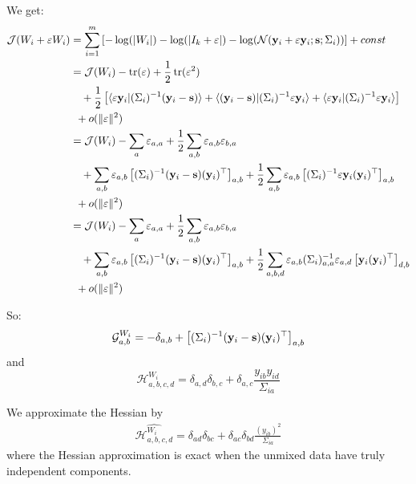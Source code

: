 \documentclass{report}
\begin{document}
 We get:
 \begin{align}
   \mathcal{J}(W_i + \varepsilon W_i) &= \sum_{i=1}^m \left[ -\log(|W_i|) -\log(|I_k + \varepsilon|) - \log(\mathcal{N}(\mathbf{y}_i + \varepsilon \mathbf{y}_i; \mathbf{s}; \Sigma_i)) \right] + const \\
                                      &= \mathcal{J}(W_i) - \mathop{\mathrm{tr}}(\varepsilon) + \frac12 \mathop{\mathrm{tr}}(\varepsilon^2) \\& \enspace \enspace + \frac12 \left[\langle \varepsilon \mathbf{y}_i| (\Sigma_i)^{-1} (\mathbf{y}_i - \mathbf{s}) \rangle + \langle (\mathbf{y}_i - \mathbf{s})| (\Sigma_i)^{-1} \varepsilon \mathbf{y}_i \rangle + \langle \varepsilon \mathbf{y}_i| (\Sigma_i)^{-1} \varepsilon \mathbf{y}_i \rangle \right] \\ & \enspace + o(\|\varepsilon\|^2) \\
   &= \mathcal{J}(W_i) - \sum_a \varepsilon_{a, a} + \frac12 \sum_{a, b} \varepsilon_{a,b} \varepsilon_{b, a} \\& \enspace \enspace + \sum_{a, b} \varepsilon_{a, b} \left[(\Sigma_i)^{-1}(\mathbf{y}_i - \mathbf{s}) (\mathbf{y}_i)^{\top} \right]_{a, b} + \frac12 \sum_{a, b} \varepsilon_{a, b} \left[(\Sigma_i)^{-1} \varepsilon \mathbf{y}_i (\mathbf{y}_i)^{\top}\right]_{a, b} \\ & \enspace + o(\|\varepsilon\|^2) \\
   &= \mathcal{J}(W_i) - \sum_a \varepsilon_{a, a} + \frac12 \sum_{a, b} \varepsilon_{a,b} \varepsilon_{b, a} \\& \enspace \enspace + \sum_{a, b} \varepsilon_{a, b} \left[(\Sigma_i)^{-1}(\mathbf{y}_i - \mathbf{s}) (\mathbf{y}_i)^{\top} \right]_{a, b} + \frac12 \sum_{a, b, d} \varepsilon_{a, b} (\Sigma_i)^{-1}_{a, a} \varepsilon_{a, d} \left[\mathbf{y}_i (\mathbf{y}_i)^{\top}\right]_{d, b} \\ & \enspace + o(\|\varepsilon\|^2) \\
 \end{align}

 So:
 \begin{equation}
 \mathcal{G}^{W_i}_{a, b} =  -\delta_{a,b} + \left[(\Sigma_i)^{-1} (\mathbf{y}_i - \mathbf{s})(\mathbf{y}_i)^{\top}\right]_{a, b}
 \end{equation}
 and
 \begin{equation}
 \mathcal{H}^{W_i}_{a, b, c, d} = \delta_{a, d}\delta_{b, c} + \delta_{a, c} \frac{y_{ib} y_{id}}{\Sigma_{ia}}
 \end{equation}
 
 We approximate the Hessian by
 \begin{align}
 \widehat{\mathcal{H}^{W_i}_{a, b, c, d}} = \delta_{ad} \delta_{bc} + \delta_{ac} \delta_{bd}\frac{(y_{ib})^2}{\Sigma_{ia}}
\end{align}
where the Hessian approximation is exact when the unmixed data have truly independent components.
\end{document}
